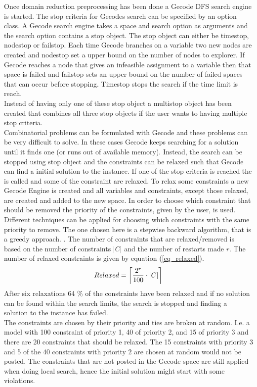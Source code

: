 Once domain reduction preprocessing has been done a Gecode DFS search engine is started. The stop criteria for Gecodes 
search can be specified by an option class. A Gecode search engine takes a space and search option 
as arguments and the search option contains a stop object. The stop object can either be timestop, nodestop or 
failstop. Each time Gecode branches on a variable two new nodes are created and nodestop set a upper bound on the 
number of nodes to explorer. If Gecode reaches a node that gives an infeasible assignment to a variable then that space 
is failed and failstop sets an upper bound on the number of failed spaces that can occur before stopping. Timestop 
stops the search if the time limit is reach. \\ 
Instead of having only one of these stop object a multistop object has been created that combines all three stop 
objects if the user wants to having multiple stop criteria. \\ 
Combinatorial problems can be formulated with Gecode and these problems can be very difficult to solve. In these cases 
Gecode keeps searching for a solution until it finds one (or runs out of available memory). Instead, the search can be 
stopped using stop object and the constraints can be relaxed such that Gecode can find a initial solution to the 
instance. If one of the stop criteria is reached the  is called and some of the constraint are relaxed. To 
relax some constraints a new Gecode Engine is created and all variables and constraints, except those relaxed, 
are created and added to the new space. In order to choose which constraint that should be removed the priority of the 
constraints, given by the user, is used. Different techniques can be applied for choosing which constraints with the 
same priority to remove. The one chosen here is a stepwise backward algorithm, that is a greedy approach. . The number of constraints that 
are relaxed/removed is based on the number of constraints $|C|$ and the number of restarts made $r$. The number of 
relaxed constraints is given by equation (\ref{eq_relaxed}). 
\begin{equation}
 Relaxed = \ceil[\bigg]{\frac{2^{r}}{100}\cdot |C|}
 \label{eq_relaxed}
\end{equation} 
After six relaxations 64 \% of the constraints have been relaxed and if no solution can be found within the search 
limits, the search is stopped and finding a solution to the instance has failed.  \\ 
The constraints are chosen by their priority and ties are broken at random. I.e. a model with 100 constraint of 
priority 1, 40 of priority 2, and 15 of priority 3 and there are 20 constraints that should be relaxed. The 15 
constraints with priority 3 and 5 of the 40 constraints with priority 2 are chosen at random would not be posted. The 
constraints that are not posted in the Gecode space are still applied when doing local search, hence the initial 
solution might start with some violations.  